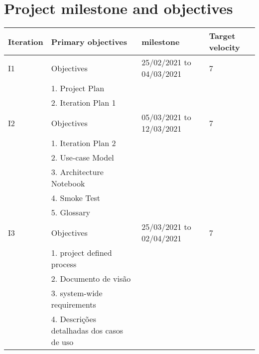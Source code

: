 \section*{Project \gls{milestone} and objectives}

\begin{adjustbox}{width=\textwidth}
\begin{tabular}{|l|l|l|l|}
\hline
Iteration & Primary objectives            & milestone                & Target velocity \\ \hline
I1        & Objectives                    & 25/02/2021 to 04/03/2021 & 7               \\
          & 1.      Project Plan          &                          &                 \\
          & 2.      Iteration Plan 1      &                          &                 \\ \hline
I2        & Objectives                    & 05/03/2021 to 12/03/2021 & 7               \\
          & 1.      Iteration Plan 2      &                          &                 \\
          & 2.      Use-case Model        &                          &                 \\
          & 3.      Architecture Notebook &                          &                 \\
          & 4.      Smoke Test            &                          &                 \\
          & 5.      Glossary              &                          &                 \\ \hline

I3        & Objectives                    & 25/03/2021 to 02/04/2021 & 7               \\
          & 1. project defined process    &                          &                 \\
          & 2. Documento de visão         &                          &                 \\
          & 3. system-wide requirements   &                          &                 \\
          & 4. Descrições detalhadas dos casos de uso&               &                 \\ \hline


\end{tabular}
\end{adjustbox}
